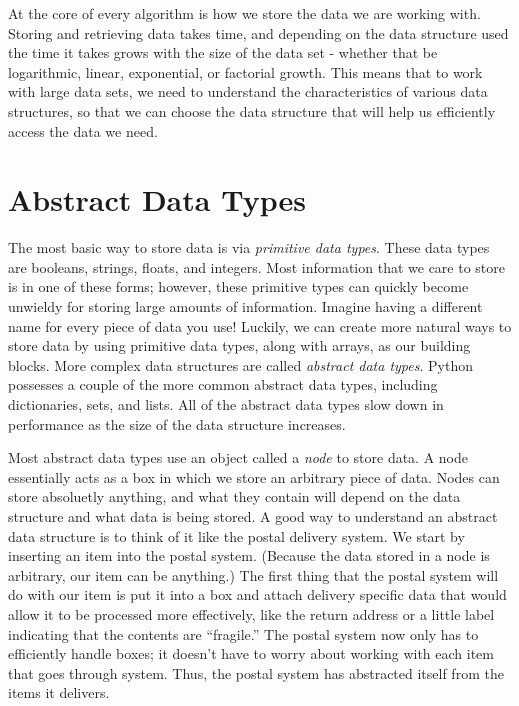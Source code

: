 \label{lab:Python_DataStructures}

At the core of every algorithm is how we store the data we are working with.
Storing and retrieving data takes time, and depending on the data structure used the time it takes grows with the size of the data set - whether that be logarithmic, linear, exponential, or factorial growth.
This means that to work with large data sets, we need to understand the characteristics of various data structures, so that we can choose the data structure that will help us efficiently access the data we need.

\section*{Abstract Data Types}

The most basic way to store data is via \emph{primitive data types}.
These data types are booleans, strings, floats, and integers.
Most information that we care to store is in one of these forms;
however, these primitive types can quickly become unwieldy for storing large amounts of information.
Imagine having a different name for every piece of data you use!
Luckily, we can create more natural ways to store data by using primitive data types, along with arrays, as our building blocks.
More complex data structures are called \emph{abstract data types}.
Python possesses a couple of the more common abstract data types, including dictionaries, sets, and lists.
All of the abstract data types slow down in performance as the size of the data structure increases. %

Most abstract data types use an object called a \emph{node} to store data.
A node essentially acts as a box in which we store an arbitrary piece of data.
Nodes can store absoluetly anything, and what they contain will depend on the data structure and what data is being stored.
A good way to understand an abstract data structure is to think of it like the postal delivery system.
We start by inserting an item into the postal system.  (Because the data stored in a node is arbitrary, our item can be anything.)
The first thing that the postal system will do with our item is put it into a box and attach delivery specific data that would allow it to be processed more effectively,
like the return address or a little label indicating that the contents are ``fragile.''
The postal system now only has to efficiently handle boxes;
it doesn't have to worry about working with each item that goes through system.
Thus, the postal system has abstracted itself from the items it delivers.

